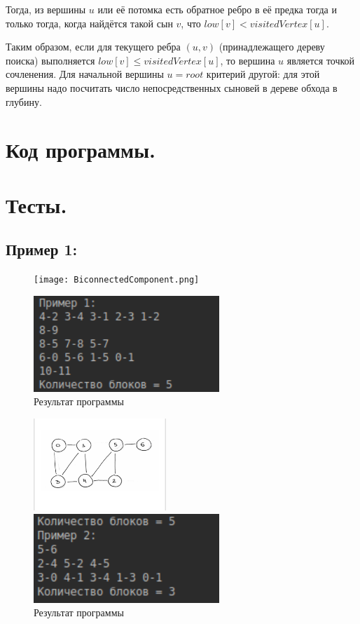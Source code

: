 \documentclass[12pt,a4paper]{scrartcl}
\begin{document}
Тогда, из вершины $u$ или её потомка есть обратное ребро в её предка тогда и только тогда, когда найдётся такой сын $v$, что $low[v] < visitedVertex[u]$.

Таким образом, если для текущего ребра $(u,v)$ (принадлежащего дереву поиска) выполняется $low[v] \le visitedVertex[u]$, то вершина $u$ является точкой сочленения. Для начальной вершины $u = root$ критерий другой: для этой вершины надо посчитать число непосредственных сыновей в дереве обхода в глубину.

\section{Код программы.}



	\newpage
\section{Тесты.}

\subsection{Пример 1:}
	\begin{figure}[h]
	\begin{multicols}{2}
		\hfill
		\texttt{[image: BiconnectedComponent.png]}
		\hfill
		\caption{Грраф из Примера 1}
		\hfill
		\includegraphics[width=70mm]{ex1.png}
		\hfill
		\caption{Результат программы}
	\end{multicols}
\end{figure}

\begin{figure}[h]
	\begin{multicols}{2}
		\hfill
		\includegraphics[width=50mm]{graph2.jpg}
		\hfill
		\caption{Граф из Примера 2}
		\hfill
		\includegraphics[width=70mm]{ex2.png}
		\hfill
		\caption{Результат программы}
	\end{multicols}
\end{figure}
\end{document}
